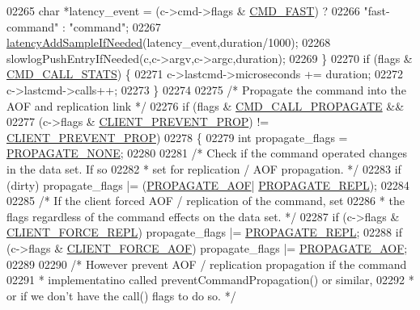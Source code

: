 \begin{DoxyCode}
{{{{{{{{{{{{{{{{{{{{{{{{{{{{{02265         \textcolor{keywordtype}{char} *latency\_event = (c->cmd->flags & \hyperlink{server_8h_ae21dc0d9c0dcdefa14ca1054c48f252f}{CMD\_FAST}) ?
02266                               \textcolor{stringliteral}{"fast-command"} : \textcolor{stringliteral}{"command"};
02267         \hyperlink{latency_8h_a77922ab34035890c90f98831a9071359}{latencyAddSampleIfNeeded}(latency\_event,duration/1000);
02268         slowlogPushEntryIfNeeded(c,c->argv,c->argc,duration);
02269     \}
02270     \textcolor{keywordflow}{if} (flags & \hyperlink{server_8h_a7b1d9cf5be21e4808da0c16f03155973}{CMD\_CALL\_STATS}) \{
02271         c->lastcmd->microseconds += duration;
02272         c->lastcmd->calls++;
02273     \}
02274 
02275     \textcolor{comment}{/* Propagate the command into the AOF and replication link */}
02276     \textcolor{keywordflow}{if} (flags & \hyperlink{server_8h_a6ee9ed603f975d0d2b6ae44f1907565f}{CMD\_CALL\_PROPAGATE} &&
02277         (c->flags & \hyperlink{server_8h_aea3bfee2e140aed0fc93bf087026f9a3}{CLIENT\_PREVENT\_PROP}) != 
      \hyperlink{server_8h_aea3bfee2e140aed0fc93bf087026f9a3}{CLIENT\_PREVENT\_PROP})
02278     \{
02279         \textcolor{keywordtype}{int} propagate\_flags = \hyperlink{server_8h_a0c7409da047d754c0adeb001025acc03}{PROPAGATE\_NONE};
02280 
02281         \textcolor{comment}{/* Check if the command operated changes in the data set. If so}
02282 \textcolor{comment}{         * set for replication / AOF propagation. */}
02283         \textcolor{keywordflow}{if} (dirty) propagate\_flags |= (\hyperlink{server_8h_a542fb79924ca427c866fd63632f60777}{PROPAGATE\_AOF}|
      \hyperlink{server_8h_a59c6e025b4ed85642a0472fc3e73e298}{PROPAGATE\_REPL});
02284 
02285         \textcolor{comment}{/* If the client forced AOF / replication of the command, set}
02286 \textcolor{comment}{         * the flags regardless of the command effects on the data set. */}
02287         \textcolor{keywordflow}{if} (c->flags & \hyperlink{server_8h_a9f89484284fb0956374bd7b6fa639602}{CLIENT\_FORCE\_REPL}) propagate\_flags |= 
      \hyperlink{server_8h_a59c6e025b4ed85642a0472fc3e73e298}{PROPAGATE\_REPL};
02288         \textcolor{keywordflow}{if} (c->flags & \hyperlink{server_8h_a451c1542a74f0181600d043df3f1b19a}{CLIENT\_FORCE\_AOF}) propagate\_flags |= 
      \hyperlink{server_8h_a542fb79924ca427c866fd63632f60777}{PROPAGATE\_AOF};
02289 
02290         \textcolor{comment}{/* However prevent AOF / replication propagation if the command}
02291 \textcolor{comment}{         * implementatino called preventCommandPropagation() or similar,}
02292 \textcolor{comment}{         * or if we don't have the call() flags to do so. */}
}}}}}}}}}}}}}}}}}}}}}}}}}}}}}
\end{DoxyCode}
